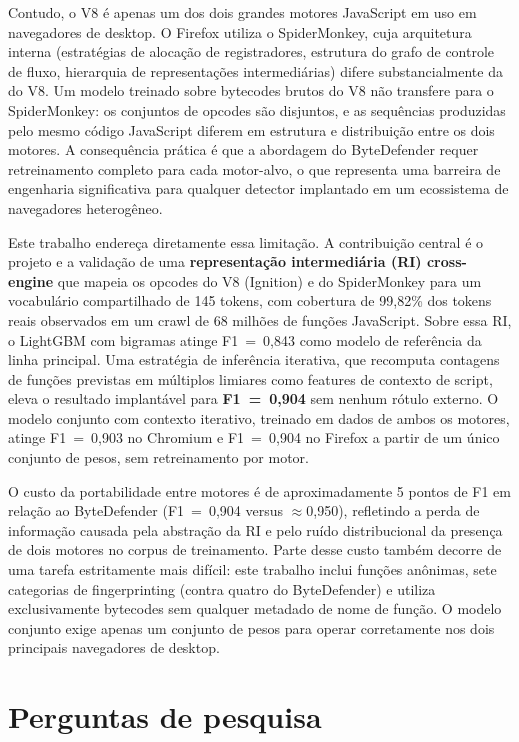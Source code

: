 Contudo, o V8 é apenas um dos dois grandes motores JavaScript em uso em
navegadores de desktop. O Firefox utiliza o SpiderMonkey, cuja arquitetura interna
(estratégias de alocação de registradores, estrutura do grafo de controle de
fluxo, hierarquia de representações intermediárias) difere substancialmente da
do V8. Um modelo treinado sobre bytecodes brutos do V8 não transfere para o
SpiderMonkey: os conjuntos de opcodes são disjuntos, e as sequências produzidas
pelo mesmo código JavaScript diferem em estrutura e distribuição entre os dois
motores. A consequência prática é que a abordagem do ByteDefender requer
retreinamento completo para cada motor-alvo, o que representa uma barreira de
engenharia significativa para qualquer detector implantado em um ecossistema de
navegadores heterogêneo.

Este trabalho endereça diretamente essa limitação. A contribuição central é o
projeto e a validação de uma \textbf{representação intermediária (RI)
cross-engine} que mapeia os opcodes do V8 (Ignition) e do SpiderMonkey para um
vocabulário compartilhado de 145 tokens, com cobertura de 99,82\% dos tokens
reais observados em um crawl de 68 milhões de funções JavaScript. Sobre
essa RI, o LightGBM com bigramas atinge F1~=~0,843 como modelo de referência da linha principal.
Uma estratégia de inferência iterativa,
que recomputa contagens de funções previstas em múltiplos limiares como features de
contexto de script, eleva o resultado implantável para \textbf{F1~=~0,904} sem
nenhum rótulo externo. O modelo conjunto com contexto iterativo, treinado em dados de ambos os motores,
atinge F1~=~0,903 no Chromium e F1~=~0,904 no Firefox a partir de um único
conjunto de pesos, sem retreinamento por motor.

O custo da portabilidade entre motores é de aproximadamente 5 pontos de F1 em
relação ao ByteDefender (F1~=~0,904 versus $\approx$0,950), refletindo a perda de
informação causada pela abstração da RI e pelo ruído distribucional da presença de
dois motores no corpus de treinamento. Parte desse custo também decorre de uma
tarefa estritamente mais difícil: este trabalho inclui funções anônimas, sete
categorias de fingerprinting (contra quatro do ByteDefender) e utiliza
exclusivamente bytecodes sem qualquer metadado de nome de função. O modelo conjunto
exige apenas um conjunto de pesos para operar corretamente nos dois principais
navegadores de desktop.

\section{Perguntas de pesquisa}
\label{sec:perguntas}

